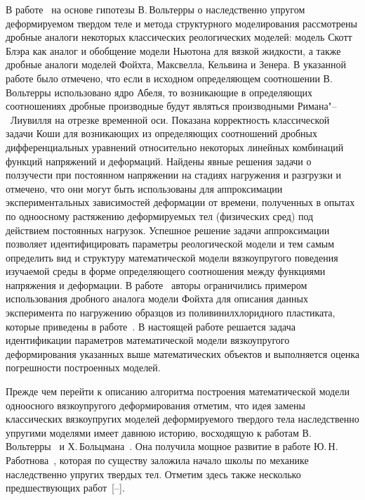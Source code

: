 \makerutitle


В работе~\cite{OgoRadUng16} на основе гипотезы В.\,Вольтерры о наследственно упругом деформируемом твердом теле и метода структурного моделирования рассмотрены дробные аналоги некоторых классических реологических моделей: модель Скотт Блэра как аналог и обобщение модели Ньютона для вязкой жидкости, а также дробные аналоги моделей Фойхта, Максвелла, Кельвина и Зенера. В указанной работе было отмечено, что если в исходном определяющем соотношении В.\,Вольтерры использовано ядро Абеля, то возникающие в определяющих соотношениях дробные производные будут являться производными Римана"--~Лиувилля на отрезке временной оси. Показана корректность классической задачи Коши для возникающих из определяющих соотношений дробных дифференциальных уравнений относительно некоторых линейных комбинаций функций напряжений и деформаций. Найдены явные решения задачи о ползучести при постоянном напряжении на стадиях нагружения и разгрузки и отмечено, что они могут быть использованы для аппроксимации экспериментальных зависимостей деформации от времени, полученных в опытах по одноосному растяжению деформируемых тел (физических сред) под действием постоянных нагрузок. Успешное решение задачи аппроксимации позволяет идентифицировать параметры реологической модели и тем самым определить вид и структуру математической модели вязкоупругого поведения изучаемой среды в форме определяющего соотношения между функциями напряжения и деформации. В работе~\cite{OgoRadUng16} авторы ограничились примером использования дробного аналога модели Фойхта для описания данных эксперимента по нагружению образцов из поливинилхлоридного пластиката, которые приведены в работе~\cite{RadchenkoGoludin}. В настоящей работе решается задача идентификации параметров математической модели вязкоупругого деформирования указанных выше  математических объектов и выполняется оценка погрешности построенных моделей.

Прежде чем перейти к описанию алгоритма построения математической модели одноосного вязкоупругого деформирования отметим, что идея замены классических вязкоупругих моделей деформируемого твердого тела наследственно упругими моделями имеет давнюю историю, восходящую к работам В.\,Вольтерры~\cite{Volterra1909, Volterra1982} и Х.\,Больцмана~\cite{Boltzman}. Она получила мощное развитие в работе Ю.\,Н.\,Работнова~\cite{Rabotnov1948}, которая по существу заложила начало школы по механике наследственно упругих твердых тел. Отметим здесь также несколько предшествующих работ~[--].

